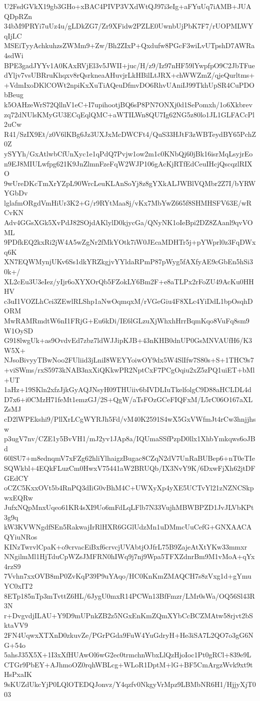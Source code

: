 U2FsdGVkX19gb3GHo+xBAC4PIVP3VXdWtQJ97i3eIg+aFYuUq7iAMB+JUAQDpRZn
34bM9PRYi7uUz4u/gLDkZG7/Zr9XFidw2PZLE0UwnbUjPbK7F7/rUOPMLWYqIjLC
MSEiTyyAchkuhzsZWMm9+Zw/Bh2ZIxP+Qxdufw8PGcF3wiLvUTpshD7AWRa4sdWi
BPE3gadJYYv1A0KAxRVjEl3v5JWII+juc/H/z9/Iz97nHF59lYwpfpO9C2JbTFue
dYljv7vsUBRruKhqxv8rQsrkneaAHuvjrLkHBilLtJRX+chWWZmZ/qjeQurltms+
+VdmIxoDKlCOWt2npiKxXuTiAQeuDfmvDO6RhvUAniIJ99TkhUpSR4CuPDObBeug
k5OAHzeWrS72QllnV1eC+I7upihootjBQ6sP8PN7ONXj0d1SePomxh/1o6Xkbrev
zq72dNUlsKMyGU3ECqEqlQMC+aWTILWn8QU7Ig62NG5z80lo1JL1GLFACcPl2uCw
R41/SzIX9Et/z0V6lKBg6Jz3UXJxMcDWCFt4/QuS33HJtF3zWBTeydBY65PchZ0Z
ySYYh/GxAtlwbCfUnXyc1e1qPdQ7Pvjw1ow2m1c0KNbQj60jBk16isrMqLsyjrEo
n9EJ8MIULwfpg621K9JnZlmnFzeFqW2WJP106gAcKjRTfEdCeuIHcjQscqzlRIXO
9wUreDKcTmXrYZpL90WrcLeuKLAnSoYj8z8gYXkALJWBlVQMbr2Z7I/bYRWYGbDv
lglafmORgdVmHiUr3K2+G/r9RYtMaa8j/vKx7MbYwZ665f8SHMHSFV63E/wRCvKN
Adv4GGsXGk5XvPdJ82SOjdAKlylD0kjycGa/QNyNK1oIeBpi2DZ8ZAanl9qvVOML
9PDfkEQ2kxRi2jW4A5wZgNr2fMkYOtk7iW0JEcaMDHTr5j+pYWprl0z3FqDWxq6K
XN7EQWMynjUKv6Ss1dkYRZkgjvYYldaRPmP87pWyg5fAXfyAE9cGbEn5hSi30k+/
XL2cEu3U3eIez/yIjr6oXYXOrQb5FZokLY6Bm2F+e8aTLPx2rFoZU49AcKu0HHHV
c3uI1VOZLhCei3ZEwlRLShp1aNwOqmqxM/rVGeGiu4F8XLc4YiDdL1bpOsqhDORM
MwRAMRmdtW6nI1FRjG+Eu6kDi/IE6lGLzuXjWhxhHrrBqmKqo8VuFq8sm9W1OySD
G918lwgUk+as9OvdvEd7zbz7ldWJJipKJB+43nKHB0dnUP0GsMNVAUfH6/K3W5X+
NJsoBivyyTBwNoo2FUliid3jLniI8WEYYoiwOY9dx5W4SlIfw7S80s+S+1THC9s7
+viSWms/rxS5973kNAB3nxXiQKkwPR2NptCxF7PCgOqiu2xZ5zPQ1uiET+bMl+UT
1aHz+19SKln2xfzJjkGyAQJNsyH09THUiiv6bIVDLIuTkelfolgC9D88aHCLDL4d
D7x6+i0CMzH71feMt1emzGJ/2S+QgW/aTsFOzGCeFIQFxM/L5rC06O167aXLZsMJ
cD2lWPEkshi9/PllXrLCgWYRJh5Fd/vM40K2591S4wX5GxVWfmJt4rCw3hnjjhsw
p3ugV7nv/CZE1y5BvVH1/mJ2yv1JAp8a/IQUmaSSfPzpD0llx1XhbYmkqws6oJBd
60lSU7+m8ednqmV7xFZg62hliYlhaigzBugac8CZqN2dV7UnRaBUBep6+nT0eTIe
SQWkbl+4EQkFLuzCm0HwxV75441aW2BRUQb/IX3NvY9K/6DxwFjXh62jtDFGEdCY
oCZC5KxxOVt5b4RnPQ3dIiG0vBhM4C+UWXyXp4yXE5UCTvYl21zNZNCSkpwxEQRw
JufxNQpMnxUqeo61KR4sXI9Uo6mFdLqLFlb7N33VujhMBWBPZD1JvJLVbKPt3g9q
kW3KVWNgdfSEn5RakwajIrRlHXR6GGlUdzMn1uDMmcUuCefG+GNXAACAQYiuNRos
KINzTwrvlCpaK+o9crvacEiBxf6crvcjUVAbtjOJfrL75B9ZajeAtXtYKw33mmxr
NNgilmMl1HjTduCpWZsJMFRN0hIWq9j7nj9Wpa5TFXZdnrBm9M1vMoA+qYx4rzS9
7Vvhn7xxOVB8mP0ZvKqP39P9uYAqo/HC0KnKmZMAQCH7s8zVxg1d+gYmuYC0xIT2
8ETp185nTp3mTvttZ6HL/6JygU0mxR14PCWn13BfFmzr/LMr0sWa/OQ56Sl43R3N
r+DvgvdjILAU+Y9D9mUPnkZB2z5NGxEnKmZQmXYbCcBCZMAtw58rjvt2bSktaVV9
2FN4UqwxXTXnD0zkuvZe/PGrPGda9FuW4YuGdryH+He3iSA7L2QO7o3gG6NG+54o
5ahsJ35X5X+1I3xXfHUAwOl6wG2ec0trmchnWbxLlQzHjoIoc1Pt0gRCl+839e9L
CTGr9PbEY+AJhmoOZ0rqhWBLcg+WLoR1DptM+lG+BF5CmArgzWvk9xt9tHsPxaIK
9sKUZdUkcYjP0LQlOTEDQJonvz/Y4qzfv0NkgyVrMpz9LBMbNR6H1/HjjyXjT003
